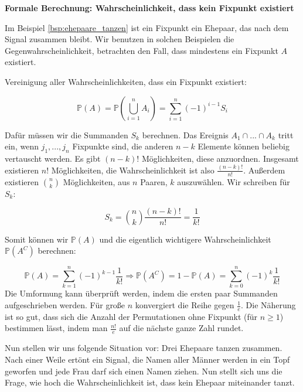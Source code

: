 {    \textbf{Formale Berechnung: Wahrscheinlichkeit, dass kein Fixpunkt existiert}

    Im Beispiel \ref{bsp:ehepaare_tanzen} ist ein Fixpunkt ein Ehepaar, das nach dem
    Signal zusammen bleibt. Wir benutzen in solchen Beispielen die
    Gegenwahrscheinlichkeit, betrachten den Fall, dass mindestens ein
    Fixpunkt $A$ existiert.

    Vereinigung aller Wahrscheinlichkeiten, dass ein Fixpunkt existiert: 

    \begin{equation*}
        \mathbb{P}\left(A\right)=\mathbb{P}\left(\overset{n}{\underset{i=1}{{\bigcup}}}A_{i}\right)=\sum
    _{i=1}^{n}\left(-1\right)^{i-1}S_{i}
    \end{equation*}

    Dafür müssen wir die Summanden $S_{k}$ berechnen. Das Ereignis $A_{1}\cap ... \cap A_{k}$ tritt ein, wenn
    $j_1,...,j_n$ Fixpunkte sind, die anderen $n-k$ Elemente können beliebig vertauscht werden. Es gibt $(n-k)!$
    Möglichkeiten, diese anzuordnen. Insgesamt existieren $n!$ Möglichkeiten, die Wahrscheinlichkeit ist also
    $\frac{(n-k)!}{n!}$. Außerdem existieren $\binom{n}{k}$ Möglichkeiten, aus $n$ Paaren, $k$ auszuwählen. 
    Wir schreiben für $S_{k}$:

    \[S_{k}=\binom{n}{k}\frac{(n-k)!}{n!}=\frac{1}{k!}\]

    Somit können wir $\mathbb P\left(A\right)$ und die eigentlich wichtigere Wahrscheinlichkeit 
    $\mathbb P\left(A^C\right)$ berechnen:

    \[
    \mathbb P\left(A\right)=\sum_{k=1}^{n}\left(-1\right)^{k-1}\frac{1}{k!}\Rightarrow
    \mathbb P\left(A^{C}\right)=1-\mathbb{P}\left(A\right)=\sum_{k=0}^{n}{\left(-1\right)^{k}\frac{1}{k!}}
    \]
    Die Umformung kann überprüft werden,
    indem die ersten paar Summanden aufgeschrieben werden. Für große $n$ konvergiert die Reihe gegen
    $\frac{1}{e}$.
    Die Näherung ist so gut, dass sich die Anzahl der Permutationen ohne
    Fixpunkt (für $n\ge1$) bestimmen lässt, indem man $\frac{n!}{e}$
    auf die nächste ganze Zahl rundet.
    \newpage
    \begin{bsp}\label{bsp:ehepaare_tanzen}

    Nun stellen wir uns folgende Situation vor: Drei Ehepaare tanzen
    zusammen. Nach einer Weile ertönt ein Signal, die Namen aller Männer
    werden in ein Topf geworfen und jede Frau darf sich einen Namen ziehen.
    Nun stellt sich uns die Frage, wie hoch die Wahrscheinlichkeit ist,
    dass kein Ehepaar miteinander tanzt.


\end{bsp}}

